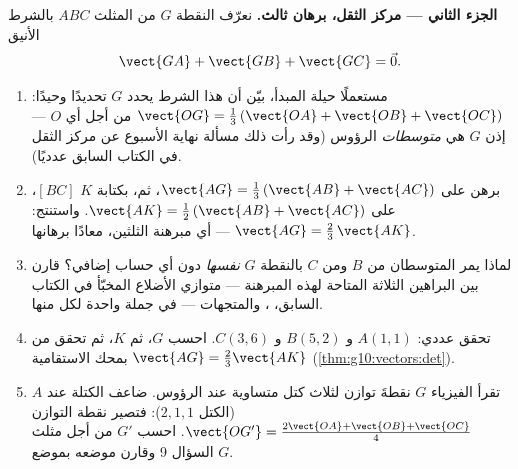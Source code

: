 \begin{problem}
\medskip
\noindent\textbf{الجزء الثاني --- مركز الثقل، برهان ثالث.}
نعرّف النقطة $G$ من المثلث $ABC$ بالشرط
الأنيق
\[
\vect{GA} + \vect{GB} + \vect{GC} = \vec 0 .
\]
\begin{enumerate}[resume]
  \item مستعملًا حيلة المبدأ، بيّن أن هذا الشرط
        يحدد $G$ تحديدًا وحيدًا:
        $\vect{OG} = \frac13\left(\vect{OA} + \vect{OB} +
        \vect{OC}\right)$ من أجل أي $O$ --- إذن 
        $G$ هي \emph{متوسطات}  الرؤوس
        (وقد رأت ذلك مسألة نهاية الأسبوع عن مركز الثقل في الكتاب السابق عدديًا).
  \item برهن على $\vect{AG} = \frac13\left(\vect{AB} +
        \vect{AC}\right)$، ثم، بكتابة $K$ 
        $[BC]$، على $\vect{AK} = \frac12\left(\vect{AB} +
        \vect{AC}\right)$. واستنتج:
        $\vect{AG} = \frac23\,\vect{AK}$ --- أي مبرهنة
        الثلثين، معادًا برهانها.
  \item لماذا يمر المتوسطان من $B$ ومن $C$ بالنقطة
        $G$ \emph{نفسها} دون أي حساب إضافي؟
        قارن بين البراهين الثلاثة المتاحة لهذه المبرهنة ---
        متوازي الأضلاع المخبّأ في الكتاب السابق، ، والمتجهات ---
        في جملة واحدة لكل منها.
  \item تحقق عددي: $A(1, 1)$ و $B(5, 2)$ و $C(3, 6)$.
        احسب $G$، ثم $K$، ثم تحقق من
        $\vect{AG} = \frac23 \vect{AK}$ بمحك الاستقامية
        (\cref{thm:g10:vectors:det}).
  \item تقرأ الفيزياء $G$ نقطةَ توازن لثلاث كتل
        متساوية عند الرؤوس. ضاعف الكتلة عند $A$ (الكتل
        $2, 1, 1$): فتصير نقطة التوازن
        $\vect{OG'} = \frac{2\vect{OA} + \vect{OB} +
        \vect{OC}}{4}$. احسب $G'$ من أجل مثلث
        السؤال 9 وقارن موضعه بموضع $G$.
\end{enumerate}


\end{problem}
